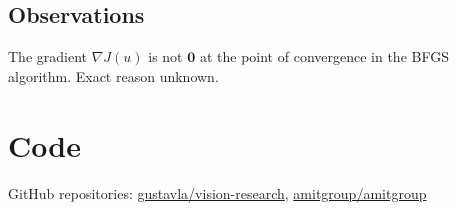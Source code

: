 \documentclass{article}
\begin{document}
\subsection{Observations}
The gradient $\nabla J(u)$ is not $\mathbf{0}$ at the point of convergence in the BFGS algorithm. Exact reason unknown.

\section{Code}
GitHub repositories: \href{https://github.com/gustavla/vision-research/}{gustavla/vision-research}, \href{https://github.com/amitgroup/amitgroup}{amitgroup/amitgroup}
\end{document}
